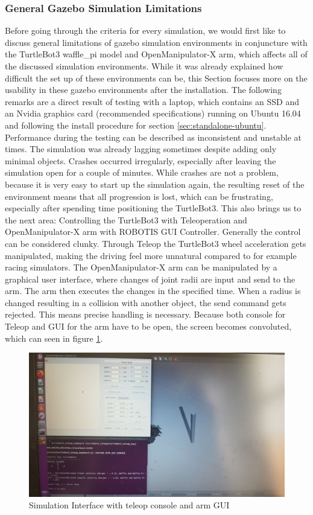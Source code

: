 \documentclass[plainarticle,zihtitle,english,final,hyperref,utf8]{zihpub}
\begin{document}
\subsubsection{General Gazebo Simulation Limitations}
Before going through the criteria for every simulation, we would first like to discuss general limitations of gazebo simulation environments in conjuncture with the TurtleBot3 waffle\_pi model and OpenManipulator-X arm, which affects all of the discussed simulation environments. While it was already explained how difficult the set up of these environments can be, this Section focuses more on the usability in these gazebo environments after the installation. The following remarks are a direct result of testing with a laptop, which contains an SSD and an Nvidia graphics card (recommended specifications) running on Ubuntu 16.04 and following the install procedure for section \ref{sec:standalone-ubuntu}.\\ 
\newline
Performance during the testing can be described as inconsistent and unstable at times. The simulation was already lagging sometimes despite adding only minimal objects. Crashes occurred irregularly, especially after leaving the simulation open for a couple of minutes. While crashes are not a problem, because it is very easy to start up the simulation again, the resulting reset of the environment means that all progression is lost, which can be frustrating, especially after spending time positioning the TurtleBot3. This also brings us to the next area: Controlling the TurtleBot3 with Teleoperation and OpenManipulator-X arm with ROBOTIS GUI Controller. Generally the control can be considered clunky. Through Teleop the TurtleBot3 wheel acceleration gets manipulated, making the driving feel more unnatural compared to for example racing simulators. The OpenManipulator-X arm can be manipulated by a graphical user interface, where changes of joint radii are input and send to the arm. The arm then executes the changes in the specified time. When a radius is changed resulting in a collision with another object, the send command gets rejected. This means precise handling is necessary. Because both console for Teleop and GUI for the arm have to be open, the screen becomes convoluted, which can seen in figure \ref{fig:gazsim1}.
\newline
\begin{figure}[h!]
  \begin{center}
    \includegraphics[width=.75\textwidth]{GazeboSim1.jpeg}
    \caption{Simulation Interface with teleop console and arm GUI}
    \label{fig:gazsim1}
  \end{center}
\end{figure}\\
\end{document}
